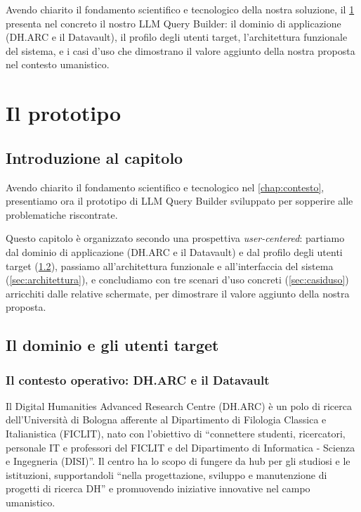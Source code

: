 \documentclass[12pt,a4paper,oneside]{book}
\begin{document}
    Avendo chiarito il fondamento scientifico e tecnologico della nostra soluzione, il \cref{chap:prototipo} presenta nel concreto il nostro LLM Query Builder: il dominio di applicazione (DH.ARC e il Datavault), il profilo degli utenti target, l'architettura funzionale del sistema, e i casi d'uso che dimostrano il valore aggiunto della nostra proposta nel contesto umanistico. 
\chapter{Il prototipo}\label{chap:prototipo}

\section{Introduzione al capitolo}\label{sec:intro_cap3}

    Avendo chiarito il fondamento scientifico e tecnologico nel \cref{chap:contesto}, presentiamo ora il prototipo di LLM Query Builder sviluppato per sopperire alle problematiche riscontrate.

    Questo capitolo è organizzato secondo una prospettiva \textit{user-centered}: partiamo dal dominio di applicazione (DH.ARC e il Datavault) e dal profilo degli utenti target (\cref{sec:dominio}), passiamo all'architettura funzionale e all'interfaccia del sistema (\cref{sec:architettura}), e concludiamo con tre scenari d'uso concreti (\cref{sec:casiduso}) arricchiti dalle relative schermate, per dimostrare il valore aggiunto della nostra proposta.

\section{Il dominio e gli utenti target}\label{sec:dominio}

    \subsection{Il contesto operativo: DH.ARC e il Datavault}\label{subsec:dharc}
        Il Digital Humanities Advanced Research Centre (DH.ARC) è un polo di ricerca dell'Università di Bologna afferente al Dipartimento di Filologia Classica e Italianistica (FICLIT), nato con l'obiettivo di ``connettere studenti, ricercatori, personale IT e professori del FICLIT e del Dipartimento di Informatica \-- Scienza e Ingegneria (DISI)''\cite{Ams26}.
        Il centro ha lo scopo di fungere da hub per gli studiosi e le istituzioni, supportandoli ``nella progettazione, sviluppo e manutenzione di progetti di ricerca DH'' e promuovendo iniziative innovative nel campo umanistico.
\end{document}
